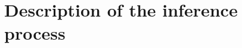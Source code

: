 \documentclass[a4paper,11pt]{article}
\begin{document}



\section{Description of the inference process}

\end{document}
